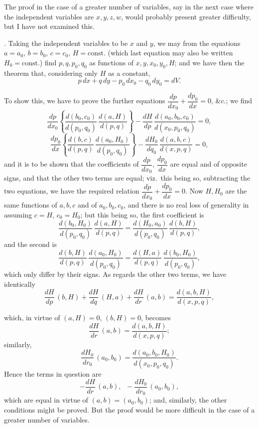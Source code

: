 \documentclass[11pt,a4paper]{article}
\begin{document}
The proof in the case of a greater number of variables, say in the next case where the independent variables are $x, y, z, w$, would probably present greater difficulty, but I have not examined this.

\medskip

. Taking the independent variables to be $x$ and $y$, we may from the equations $a = a_{0}$, $b = b_{0}$, $c = c_{0}$, $H = \text{const.}$ (which last equation may also be written $H_{0} = \text{const.}$) find $p, q, p_{0}, q_{0}$ as functions of $x, y, x_{0}, y_{0}, H$; and we have then the theorem that, considering only $H$ as a constant,
\[
p\,dx + q\,dy - p_{0}\,dx_{0} - q_{0}\,dy_{0} = dV.
\]

To show this, we have to prove the further equations $\dfrac{dp}{dx_{0}} + \dfrac{dp_{0}}{dx} = 0$, \&c.; we find
\[
\frac{dp}{dx_{0}}\!\left\{ \frac{d(b_{0}, c_{0})}{d(p_{0}, q_{0})}\,\frac{d(a, H)}{d(p, q)} \right\} - \frac{dH}{dp}\,\frac{d(a_{0}, b_{0}, c_{0})}{d(x_{0}, p_{0}, q_{0})} = 0,
\]
\[
\frac{dp_{0}}{dx}\!\left\{ \frac{d(b, c)}{d(p, q)}\,\frac{d(a_{0}, H_{0})}{d(p_{0}, q_{0})} \right\} - \frac{dH_{0}}{dq_{0}}\,\frac{d(a, b, c)}{d(x, p, q)} = 0,
\]
and it is to be shown that the coefficients of $\dfrac{dp}{dx_{0}}$, $\dfrac{dp_{0}}{dx}$ are equal and of opposite signs, and that the other two terms are equal; viz.\ this being so, subtracting the two equations, we have the required relation $\dfrac{dp}{dx_{0}} + \dfrac{dp_{0}}{dx} = 0$. Now $H, H_{0}$ are the same functions of $a, b, c$ and of $a_{0}, b_{0}, c_{0}$, and there is no real loss of generality in assuming $c = H$, $c_{0} = H_{0}$; but this being so, the first coefficient is
\[
\frac{d(b_{0}, H_{0})}{d(p_{0}, q_{0})}\,\frac{d(a, H)}{d(p, q)} = \frac{d(H_{0}, a_{0})}{d(p_{0}, q_{0})}\,\frac{d(b, H)}{d(p, q)},
\]
and the second is
\[
\frac{d(b, H)}{d(p, q)}\,\frac{d(a_{0}, H_{0})}{d(p_{0}, q_{0})} = \frac{d(H, a)}{d(p, q)}\,\frac{d(b_{0}, H_{0})}{d(p_{0}, q_{0})},
\]
which only differ by their signs. As regards the other two terms, we have identically
\[
\frac{dH}{dp}\,(b, H) + \frac{dH}{dq}\,(H, a) + \frac{dH}{dr}\,(a, b) = \frac{d(a, b, H)}{d(x, p, q)},
\]

\newpage


which, in virtue of $(a, H) = 0$, $(b, H) = 0$, becomes
\[
\frac{dH}{dr}\,(a, b) = \frac{d(a, b, H)}{d(x, p, q)};
\]
similarly,
\[
\frac{dH_{0}}{dr_{0}}\,(a_{0}, b_{0}) = \frac{d(a_{0}, b_{0}, H_{0})}{d(x_{0}, p_{0}, q_{0})}.
\]
Hence the terms in question are
\[
- \frac{dH}{dr}\,(a, b), \;\; - \frac{dH_{0}}{dr_{0}}\,(a_{0}, b_{0}),
\]
which are equal in virtue of $(a, b) = (a_{0}, b_{0})$; and, similarly, the other conditions might be proved. But the proof would be more difficult in the case of a greater number of variables.
\end{document}
